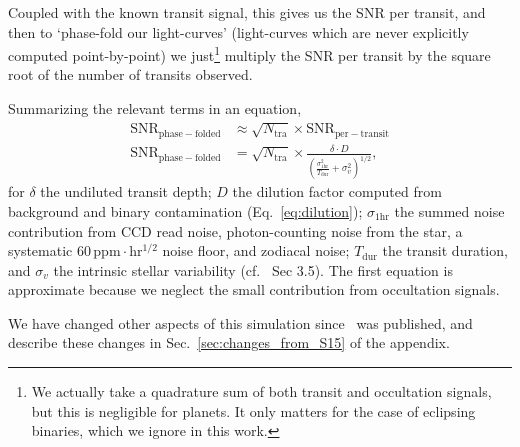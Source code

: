 Coupled with the known transit signal, this gives us 
the SNR per transit, and then to `phase-fold our light-curves' (light-curves 
which are never explicitly computed point-by-point) we just\footnote{We
  actually take a quadrature sum of both transit and occultation
  signals, but this is negligible for planets. It only matters for the
  case of eclipsing binaries, which we ignore in this work.} multiply
the SNR per transit by the square root of the number of transits
observed.

Summarizing the relevant terms in an equation,
\begin{align}
\label{eq:snr} \mathrm{SNR}_\mathrm{phase-folded} &\approx
\sqrt{N_\mathrm{tra}} \times \mathrm{SNR}_\mathrm{per-transit}\nonumber \\
\mathrm{SNR}_\mathrm{phase-folded} &= \sqrt{N_\mathrm{tra}} \times 
\frac{\delta \cdot D}{\left(\frac{\sigma_\mathrm{1hr}^2}{T_\mathrm{dur}} 
	+ \sigma_v^2 \right)^{1/2}}, 
\end{align}
for $\delta$ the undiluted transit depth; $D$ the dilution factor
computed from background and binary contamination (Eq.~\ref{eq:dilution});
$\sigma_\mathrm{1hr}$ the summed noise contribution from CCD read noise, 
photon-counting noise from the star, a systematic 
$60\,\mathrm{ppm\cdot hr^{1/2}}$ noise floor, and zodiacal noise;
$T_\mathrm{dur}$ the transit duration, and $\sigma_v$ the intrinsic
stellar variability (cf.~ Sec 3.5).
The first equation is approximate because we neglect the
small contribution from occultation signals.

We have changed other aspects of this simulation
since~ was published, and describe these
changes in Sec.~\ref{sec:changes_from_S15} of the appendix.
